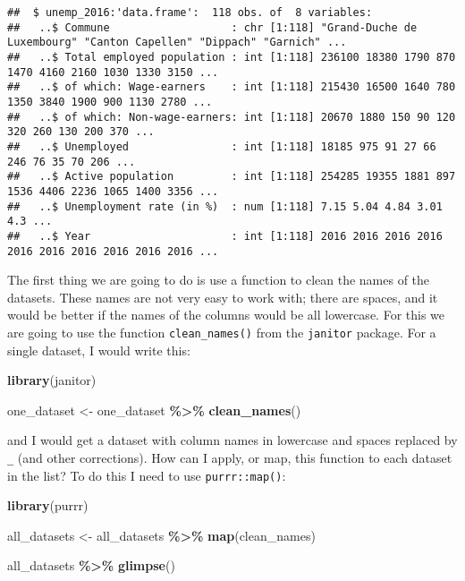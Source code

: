 \documentclass[
]{article}
\newenvironment{Shaded}{\begin{snugshade}}{\end{snugshade}}
\newcommand{\KeywordTok}[1]{\textcolor[rgb]{0.13,0.29,0.53}{\textbf{#1}}}
\newcommand{\NormalTok}[1]{#1}
\newcommand{\OperatorTok}[1]{\textcolor[rgb]{0.81,0.36,0.00}{\textbf{#1}}}
\newcommand{\StringTok}[1]{\textcolor[rgb]{0.31,0.60,0.02}{#1}}
\begin{document}
\begin{verbatim}
##  $ unemp_2016:'data.frame':  118 obs. of  8 variables:
##   ..$ Commune                   : chr [1:118] "Grand-Duche de Luxembourg" "Canton Capellen" "Dippach" "Garnich" ...
##   ..$ Total employed population : int [1:118] 236100 18380 1790 870 1470 4160 2160 1030 1330 3150 ...
##   ..$ of which: Wage-earners    : int [1:118] 215430 16500 1640 780 1350 3840 1900 900 1130 2780 ...
##   ..$ of which: Non-wage-earners: int [1:118] 20670 1880 150 90 120 320 260 130 200 370 ...
##   ..$ Unemployed                : int [1:118] 18185 975 91 27 66 246 76 35 70 206 ...
##   ..$ Active population         : int [1:118] 254285 19355 1881 897 1536 4406 2236 1065 1400 3356 ...
##   ..$ Unemployment rate (in %)  : num [1:118] 7.15 5.04 4.84 3.01 4.3 ...
##   ..$ Year                      : int [1:118] 2016 2016 2016 2016 2016 2016 2016 2016 2016 2016 ...
\end{verbatim}

The first thing we are going to do is use a function to clean the names of the datasets. These
names are not very easy to work with; there are spaces, and it would be better if the names of the
columns would be all lowercase. For this we are going to use the function \texttt{clean\_names()} from the
\texttt{janitor} package. For a single dataset, I would write this:

\begin{Shaded}
\begin{Highlighting}[]
\KeywordTok{library}\NormalTok{(janitor)}

\NormalTok{one\_dataset \textless{}{-}}\StringTok{ }\NormalTok{one\_dataset }\OperatorTok{\%\textgreater{}\%}
\StringTok{  }\KeywordTok{clean\_names}\NormalTok{()}
\end{Highlighting}
\end{Shaded}

and I would get a dataset with column names in lowercase and spaces replaced by \texttt{\_} (and other
corrections). How can I apply, or map, this function to each dataset in the list? To do this I need
to use \texttt{purrr::map()}:

\begin{Shaded}
\begin{Highlighting}[]
\KeywordTok{library}\NormalTok{(purrr)}

\NormalTok{all\_datasets \textless{}{-}}\StringTok{ }\NormalTok{all\_datasets }\OperatorTok{\%\textgreater{}\%}
\StringTok{  }\KeywordTok{map}\NormalTok{(clean\_names)}

\NormalTok{all\_datasets }\OperatorTok{\%\textgreater{}\%}
\StringTok{  }\KeywordTok{glimpse}\NormalTok{()}
\end{Highlighting}
\end{Shaded}
\end{document}
